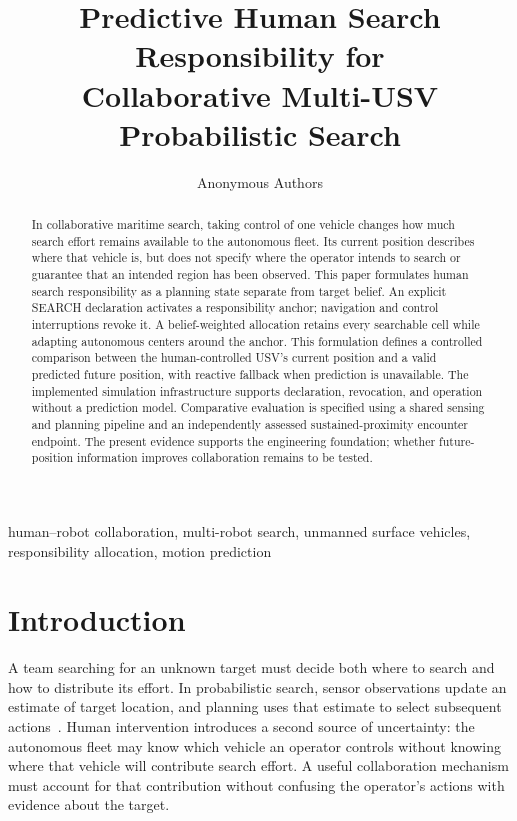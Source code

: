 \documentclass[conference]{IEEEtran}
\title{Predictive Human Search Responsibility for\\Collaborative Multi-USV Probabilistic Search}
\author{Anonymous Authors}
\begin{document}
\maketitle
\begin{abstract}
In collaborative maritime search, taking control of one vehicle changes how much search effort remains available to the autonomous fleet. Its current position describes where that vehicle is, but does not specify where the operator intends to search or guarantee that an intended region has been observed. This paper formulates human search responsibility as a planning state separate from target belief. An explicit SEARCH declaration activates a responsibility anchor; navigation and control interruptions revoke it. A belief-weighted allocation retains every searchable cell while adapting autonomous centers around the anchor. This formulation defines a controlled comparison between the human-controlled USV's current position and a valid predicted future position, with reactive fallback when prediction is unavailable. The implemented simulation infrastructure supports declaration, revocation, and operation without a prediction model. Comparative evaluation is specified using a shared sensing and planning pipeline and an independently assessed sustained-proximity encounter endpoint. The present evidence supports the engineering foundation; whether future-position information improves collaboration remains to be tested.
\end{abstract}

\begin{IEEEkeywords}
human--robot collaboration, multi-robot search, unmanned surface vehicles, responsibility allocation, motion prediction
\end{IEEEkeywords}

\section{Introduction}
A team searching for an unknown target must decide both where to search and how to distribute its effort. In probabilistic search, sensor observations update an estimate of target location, and planning uses that estimate to select subsequent actions~\cite{b1,b7}. Human intervention introduces a second source of uncertainty: the autonomous fleet may know which vehicle an operator controls without knowing where that vehicle will contribute search effort. A useful collaboration mechanism must account for that contribution without confusing the operator's actions with evidence about the target.
\end{document}
